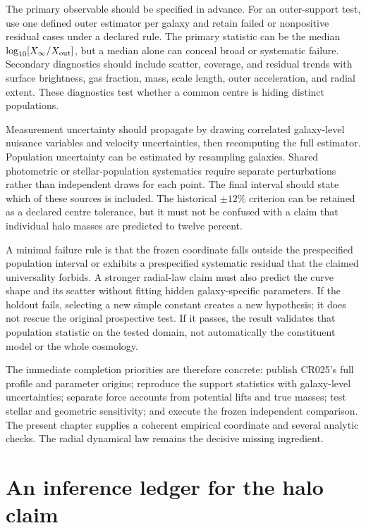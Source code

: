 The primary observable should be specified in advance. For an outer-support test, use one defined outer estimator per galaxy and retain failed or nonpositive residual cases under a declared rule. The primary statistic can be the median $\log_{10}[X_\infty/X_{\rm out}]$, but a median alone can conceal broad or systematic failure. Secondary diagnostics should include scatter, coverage, and residual trends with surface brightness, gas fraction, mass, scale length, outer acceleration, and radial extent. These diagnostics test whether a common centre is hiding distinct populations.

Measurement uncertainty should propagate by drawing correlated galaxy-level nuisance variables and velocity uncertainties, then recomputing the full estimator. Population uncertainty can be estimated by resampling galaxies. Shared photometric or stellar-population systematics require separate perturbations rather than independent draws for each point. The final interval should state which of these sources is included. The historical $\pm12\%$ criterion can be retained as a declared centre tolerance, but it must not be confused with a claim that individual halo masses are predicted to twelve percent.

A minimal failure rule is that the frozen coordinate falls outside the prespecified population interval or exhibits a prespecified systematic residual that the claimed universality forbids. A stronger radial-law claim must also predict the curve shape and its scatter without fitting hidden galaxy-specific parameters. If the holdout fails, selecting a new simple constant creates a new hypothesis; it does not rescue the original prospective test. If it passes, the result validates that population statistic on the tested domain, not automatically the constituent model or the whole cosmology.

The immediate completion priorities are therefore concrete: publish CR025's full profile and parameter origins; reproduce the support statistics with galaxy-level uncertainties; separate force accounts from potential lifts and true masses; test stellar and geometric sensitivity; and execute the frozen independent comparison. The present chapter supplies a coherent empirical coordinate and several analytic checks. The radial dynamical law remains the decisive missing ingredient.

\section{An inference ledger for the halo claim}

